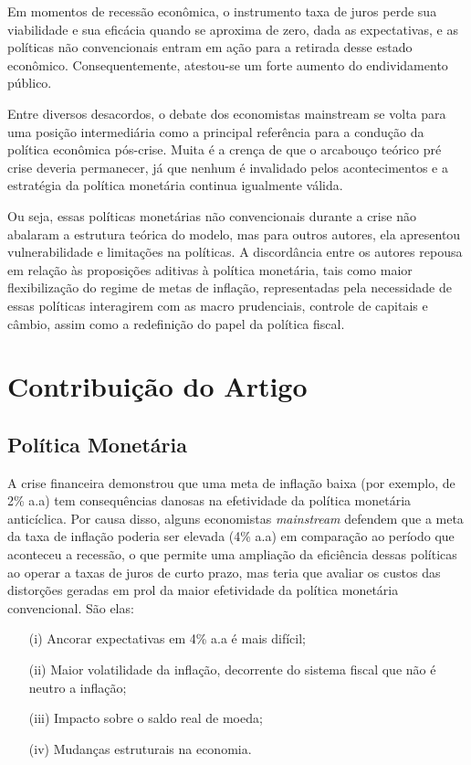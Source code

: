 \documentclass[report]{uftex}
\begin{document}
Em momentos de recessão econômica, o instrumento taxa de juros perde sua viabilidade e sua eficácia quando se aproxima de zero, dada as expectativas, e as políticas não convencionais entram em ação para a retirada desse estado econômico. Consequentemente, atestou-se um forte aumento do endividamento público.

Entre diversos desacordos, o debate dos economistas mainstream se volta para uma posição intermediária como a principal referência para a condução da política econômica pós-crise. Muita é a crença de que o arcabouço teórico pré crise deveria permanecer, já que nenhum é invalidado pelos acontecimentos e a estratégia da política monetária continua igualmente válida. 

Ou seja, essas políticas monetárias não convencionais durante a crise não abalaram a estrutura teórica do modelo, mas para outros autores, ela apresentou vulnerabilidade e limitações na políticas. A discordância entre os autores repousa em relação às proposições aditivas à política monetária, tais como maior flexibilização do regime de metas de inflação, representadas pela necessidade de essas políticas interagirem com as macro prudenciais, controle de capitais e câmbio, assim como a redefinição  do papel da política fiscal.

\section{Contribuição do Artigo}

\subsection{Política Monetária}

A crise financeira demonstrou que uma meta de inflação baixa (por exemplo, de 2\% a.a) tem consequências danosas na efetividade da política monetária anticíclica. Por causa disso, alguns economistas \textit{mainstream} defendem que a meta da taxa de inflação poderia ser elevada (4\% a.a) em comparação ao período que aconteceu a recessão, o que permite uma ampliação da eficiência dessas políticas ao operar a taxas de juros de curto prazo, mas teria que avaliar os custos das distorções geradas em prol da maior efetividade da política monetária convencional. São elas: 

\begin{itemize}
	\item[(i)] Ancorar expectativas em 4\% a.a é mais difícil;
	\item[(ii)] Maior volatilidade da inflação, decorrente do sistema fiscal que não é neutro a inflação;
	\item[(iii)] Impacto sobre o saldo real de moeda;
	\item[(iv)] Mudanças estruturais na economia.
\end{itemize}
\end{document}
